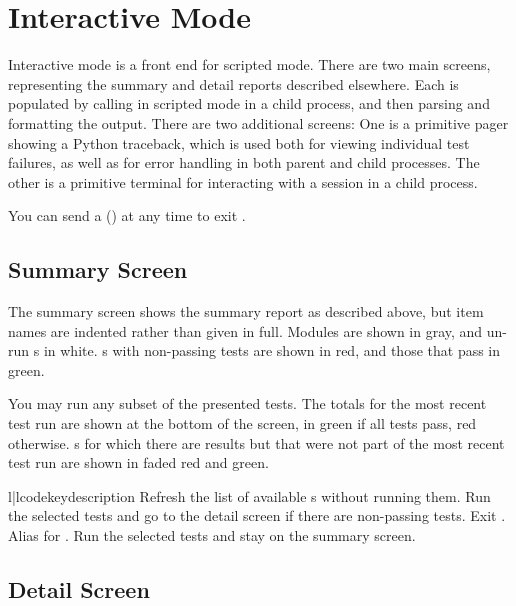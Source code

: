\chapter{Interactive Mode \label{interactive}}

Interactive mode is a front end for scripted mode. There are two main screens,
representing the summary and detail reports described elsewhere. Each is
populated by calling  in scripted mode in a child process,
and then parsing and formatting the output. There are two additional screens:
One is a primitive pager showing a Python traceback, which is used both for
viewing individual test failures, as well as for error handling in both parent
and child processes. The other is a primitive terminal for interacting with a
 session in a child process.

You can send a  () at any time to exit
.


\section{Summary Screen \label{summary}}

The summary screen shows the summary report as described above, but item names
are indented rather than given in full. Modules are shown in gray, and un-run
s in white. s with non-passing tests are shown in red, and those
that pass in green.

You may run any subset of the presented tests. The totals for the most recent
test run are shown at the bottom of the screen, in green if all tests pass, red
otherwise. s for which there are results but that were not part of the
most recent test run are shown in faded red and green.

\begin{tableii}{l|l}{code}{key}{description}
    {Refresh the list of available s without running them.}
    {Run the selected tests and go to the detail screen if there are non-passing
    tests.}
    {Exit .}
    {Alias for .}
    {Run the selected tests and stay on the summary screen.}
\end{tableii}


\section{Detail Screen \label{detail}}

